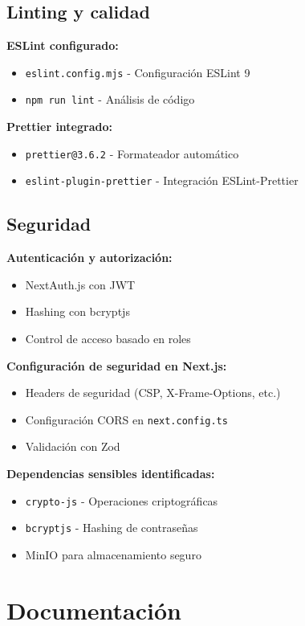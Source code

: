 \documentclass[12pt,a4paper]{article}
\begin{document}
\begin{enumerate}
\subsection{Linting y calidad}

\textbf{ESLint configurado:}
\begin{itemize}
    \item \texttt{eslint.config.mjs} - Configuración ESLint 9
    \item \texttt{npm run lint} - Análisis de código
\end{itemize}

\textbf{Prettier integrado:}
\begin{itemize}
    \item \texttt{prettier@3.6.2} - Formateador automático
    \item \texttt{eslint-plugin-prettier} - Integración ESLint-Prettier
\end{itemize}

\subsection{Seguridad}

\textbf{Autenticación y autorización:}
\begin{itemize}
    \item NextAuth.js con JWT
    \item Hashing con bcryptjs
    \item Control de acceso basado en roles
\end{itemize}

\textbf{Configuración de seguridad en Next.js:}
\begin{itemize}
    \item Headers de seguridad (CSP, X-Frame-Options, etc.)
    \item Configuración CORS en \texttt{next.config.ts}
    \item Validación con Zod
\end{itemize}

\textbf{Dependencias sensibles identificadas:}
\begin{itemize}
    \item \texttt{crypto-js} - Operaciones criptográficas
    \item \texttt{bcryptjs} - Hashing de contraseñas
    \item MinIO para almacenamiento seguro
\end{itemize}

\section{Documentación}


\end{enumerate}
\end{document}
